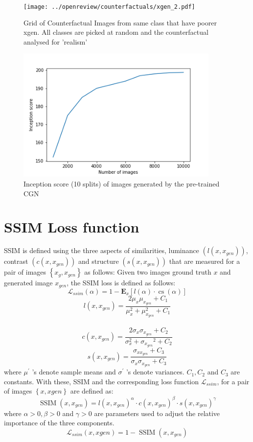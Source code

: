 \begin{figure}[ht!]
\centering 
    \texttt{[image: ../openreview/counterfactuals/xgen\_2.pdf]}
    \caption{Grid of Counterfactual Images from same class that have poorer x{gen}.
    All classes are picked at random and the counterfactual analysed for 'realism'}
    \label{fig:poor_counterfactuals}
\end{figure}

\begin{figure}[h!]
    \centering
    \includegraphics[width=10cm]{../openreview/images/inception.png}
    \caption{Inception score (10 splits) of images generated by the pre-trained CGN}
    \label{fig:inception}
\end{figure}

\newpage

\section{SSIM Loss function}
SSIM \cite{wang2004image} is defined using the three aspects of similarities, luminance $\left(l\left(x, x_{g e n}\right)\right)$, contrast $\left(c\left(x, x_{g e n}\right)\right)$ and structure $\left(s\left(x, x_{g e n}\right)\right)$ that are measured for a pair of images $\left\{x_{g}, x_{g e n}\right\}$ as follows: Given two images ground truth $x$ and generated image $x_{gen}$, the SSIM \cite{wang2004image} loss is defined as follows:
$$
\mathcal{L}_{ssim}(\alpha)=1-\mathbf{E}_{x}[l(\alpha) \cdot \operatorname{cs}(\alpha)]
$$
$$l\left(x, x_{g e n}\right)=\frac{2 \mu_{x} \mu_{x_{g e n}}+C_{1}}{\mu_{x}^{2}+\mu_{x_{g e n}}^{2}+C_{1}}$$\\
$$c\left(x, x_{g e n}\right)=\frac{2 \sigma_{x} \sigma_{x_{g e n}}+C_{2}}{\sigma_{x}^{2}+\sigma_{x_{g e n}}{ }^{2}+C_{2}}$$
$$s\left(x, x_{g e n}\right)=\frac{\sigma_{x x_{g c n}}+C_{3}}{\sigma_{x} \sigma_{x_{g e n}}+C_{3}}$$
where $\mu^{\prime}$ 's denote sample means and $\sigma^{\prime}$ 's denote variances. $C_{1}, C_{2}$ and $C_{3}$ are constants. With these, SSIM and the corresponding loss function $\mathcal{L}_{ssim}$, for a pair of images $\left\{x, x{gen}\right\}$ are defined as:
$$
\operatorname{SSIM}\left(x, x_{gen}\right)=l\left(x, x_{g e n}\right)^{\alpha} \cdot c\left(x, x_{g e n}\right)^{\beta} \cdot s\left(x, x_{g e n}\right)^{\gamma}
$$
where $\alpha>0, \beta>0$ and $\gamma>0$ are parameters used to adjust the relative importance of the three components.
$$
\mathcal{L}_{ssim}\left(x, x{g e n}\right)=1-\operatorname{SSIM}\left(x, x_{g e n}\right)
$$


